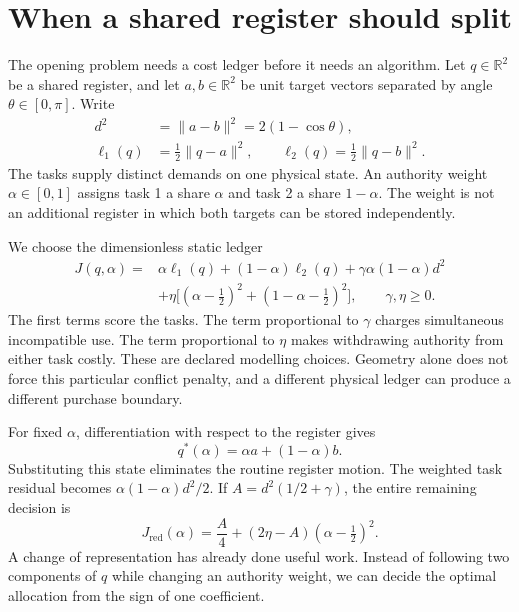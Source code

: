 \section{When a shared register should split}
\label{sec:yba-setup}

The opening problem needs a cost ledger before it needs an algorithm. Let \(q\in\mathbb R^2\) be a shared register, and let \(a,b\in\mathbb R^2\) be unit target vectors separated by angle \(\theta\in[0,\pi]\). Write
\begin{align}
 d^2&=\|a-b\|^2=2(1-\cos\theta),\nonumber\\
 \ell_1(q)&=\frac12\|q-a\|^2,\qquad
 \ell_2(q)=\frac12\|q-b\|^2 .
 \label{eq:num-toy-evaluator-losses}
\end{align}
The tasks supply distinct demands on one physical state. An authority weight \(\alpha\in[0,1]\) assigns task 1 a share \(\alpha\) and task 2 a share \(1-\alpha\). The weight is not an additional register in which both targets can be stored independently.

We choose the dimensionless static ledger
\begin{align}
 J(q,\alpha)={}&\alpha\ell_1(q)+(1-\alpha)\ell_2(q)
       +\gamma\alpha(1-\alpha)d^2 \nonumber\\
 &+\eta\big[(\alpha-\tfrac12)^2+
                  (1-\alpha-\tfrac12)^2\big],
 \qquad \gamma,\eta\geq0 .
 \label{eq:num-toy-conflict}
\end{align}
The first terms score the tasks. The term proportional to \(\gamma\) charges simultaneous incompatible use. The term proportional to \(\eta\) makes withdrawing authority from either task costly. These are declared modelling choices. Geometry alone does not force this particular conflict penalty, and a different physical ledger can produce a different purchase boundary.

For fixed \(\alpha\), differentiation with respect to the register gives
\begin{equation}
 q^*(\alpha)=\alpha a+(1-\alpha)b .
 \label{eq:num-toy-agent-b-optimum}
\end{equation}
Substituting this state eliminates the routine register motion. The weighted task residual becomes \(\alpha(1-\alpha)d^2/2\). If
\(A=d^2(1/2+\gamma)\), the entire remaining decision is
\begin{equation}
 J_{\mathrm{red}}(\alpha)
 =\frac A4+(2\eta-A)(\alpha-\tfrac12)^2 .
 \label{eq:num-toy-reduced-loss}
\end{equation}
A change of representation has already done useful work. Instead of following two components of \(q\) while changing an authority weight, we can decide the optimal allocation from the sign of one coefficient.

